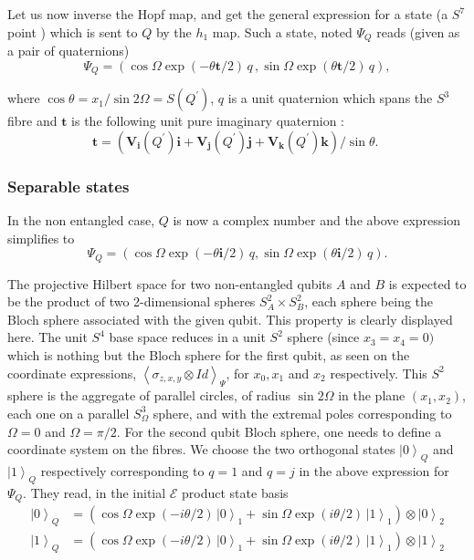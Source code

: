 \documentclass{amsart}
\begin{document}
Let us now inverse the Hopf map, and get the general expression for a state (a
$S^{7}$ point ) which is sent to $Q$ by the $h_{1}$ map. Such a state, noted
$\Psi_{Q}$ reads (given as a pair of quaternions)
\begin{equation}
\Psi_{Q}=(\cos\Omega\exp\left(  -\theta\mathbf{t}/2\right)  \,q\,,\sin
\Omega\exp\left(  \theta\mathbf{t}/2\right)  \,q),
\end{equation}

where $\cos\theta=x_{1}/\sin2\Omega=S(Q^{\prime})$, $q$ is a unit quaternion
which spans the $S^{3}$ fibre and $\mathbf{t}$ is the following unit pure
imaginary quaternion :%
\begin{equation}
\mathbf{t=}\left(  \mathbf{V}_{\mathbf{i}}(Q^{\prime})\mathbf{i}%
+\mathbf{V}_{\mathbf{j}}(Q^{\prime})\mathbf{j}+\mathbf{V}_{\mathbf{k}%
}(Q^{\prime})\mathbf{k}\right)  /\sin\theta\text{. }%
\end{equation}

\subsubsection{Separable states}

In the non entangled case, $Q$ is now a complex number and the above
expression simplifies to%
\begin{equation}
\Psi_{Q}=(\cos\Omega\exp\left(  -\theta\mathbf{i}/2\right)  \,q,\sin\Omega
\exp\left(  \theta\mathbf{i}/2\right)  \,q).
\end{equation}

The projective Hilbert space for two non-entangled qubits $A$ and $B$ is
expected to be the product of two 2-dimensional spheres $S_{A}^{2}\times
S_{B}^{2}$, each sphere being the Bloch sphere associated with the given
qubit. This property is clearly displayed here. The unit $S^{4}$ base space
reduces in a unit $S^{2}$ sphere (since $x_{3}=x_{4}=0)$ which is nothing but
the Bloch sphere for the first qubit, as seen on the coordinate expressions,
$\left\langle \sigma_{z,x,y}\otimes Id\right\rangle _{\Psi}$, for $x_{0}%
,x_{1}$ and $x_{2}$ respectively. This $S^{2}$ sphere is the aggregate of
parallel circles, of radius $\sin2\Omega$ in the plane $\left(  x_{1}%
,x_{2}\right)  $, each one on a parallel $S_{\Omega}^{3}$ sphere, and with the
extremal poles corresponding to $\Omega=0$ and $\Omega=\pi/2$. For the second
qubit Bloch sphere, one needs to define a coordinate system on the fibres. We
choose the two orthogonal states $\left|  0\right\rangle _{Q}$ and $\left|
1\right\rangle _{Q}$ respectively corresponding to $q=1$ and $q=j$ in the
above expression for $\Psi_{Q}$. They read, in the initial $\mathcal{E}$
product state basis%
\begin{align}
\left|  0\right\rangle _{Q} &  =\left(  \cos\Omega\exp\left(  -i\theta
/2\right)  \,\left|  0\right\rangle _{1}+\sin\Omega\exp\left(  i\theta
/2\right)  \,\left|  1\right\rangle _{1}\right)  \otimes\left|  0\right\rangle
_{2}\\
\left|  1\right\rangle _{Q} &  =\left(  \cos\Omega\exp\left(  -i\theta
/2\right)  \,\left|  0\right\rangle _{1}+\sin\Omega\exp\left(  i\theta
/2\right)  \,\left|  1\right\rangle _{1}\right)  \otimes\left|  1\right\rangle
_{2}\nonumber
\end{align}
\end{document}

